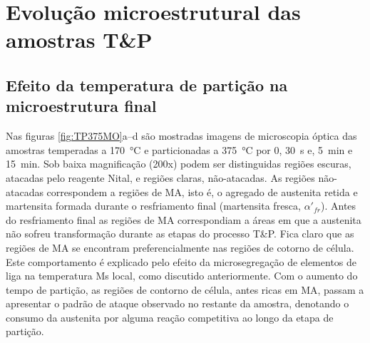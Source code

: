 \section{Evolu\c{c}\~{a}o microestrutural das amostras T\&P}

\label{sec:micros}




\subsection{Efeito da temperatura de partição na microestrutura final}

\label{sec:micros_TP}

Nas figuras \ref{fig:TP375MO}a--d são mostradas imagens de microscopia óptica das amostras temperadas a \SI{170}{\degreeCelsius} e particionadas a \SI{375}{\degreeCelsius} por 0, 30~s e, 5~min e 15~min. 
Sob baixa magnificação (200x) podem ser distinguidas regiões escuras, atacadas pelo reagente Nital, e regiões claras, não-atacadas. As regiões não-atacadas correspondem a regiões de MA, isto é, o agregado de austenita retida e martensita formada durante o resfriamento final (martensita fresca, $\alpha'_{fr}$). Antes do resfriamento final as regiões de MA correspondiam a áreas em que a austenita não sofreu transformação durante as etapas do processo T\&P.
Fica claro que as regiões de MA se encontram preferencialmente nas regiões de cotorno de célula. Este comportamento é explicado pelo efeito da microsegregação de elementos de liga na temperatura Ms local, como discutido anteriormente. Com o aumento do tempo de partição, as regiões de contorno de célula, antes ricas em MA, passam a apresentar o padrão de ataque observado no restante da amostra, denotando o consumo da austenita por alguma reação competitiva ao longo da etapa de partição. 

